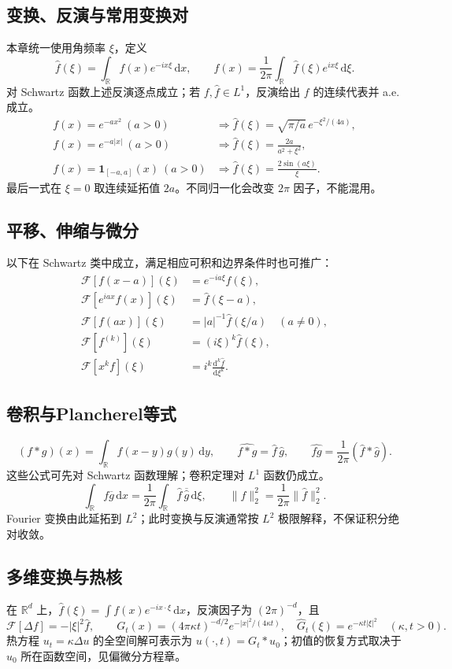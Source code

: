 \documentclass[../main.tex]{subfiles}
\begin{document}
\subsection{变换、反演与常用变换对}
本章统一使用角频率 $\xi$，定义
\[
\widehat f(\xi)=\int_{\mathbb R}f(x)e^{-ix\xi}\,\mathrm dx,\qquad
f(x)=\frac1{2\pi}\int_{\mathbb R}\widehat f(\xi)e^{ix\xi}\,\mathrm d\xi.
\]
对 Schwartz 函数上述反演逐点成立；若 $f,\widehat f\in L^1$，反演给出 $f$ 的连续代表并 a.e. 成立。
\begin{align*}
f(x)=e^{-ax^2}\ (a>0)&\Longrightarrow\widehat f(\xi)=\sqrt{\pi/a}\,e^{-\xi^2/(4a)},\\
f(x)=e^{-a|x|}\ (a>0)&\Longrightarrow\widehat f(\xi)=\frac{2a}{a^2+\xi^2},\\
f(x)=\bm1_{[-a,a]}(x)\ (a>0)&\Longrightarrow\widehat f(\xi)=\frac{2\sin(a\xi)}\xi.
\end{align*}
最后一式在 $\xi=0$ 取连续延拓值 $2a$。不同归一化会改变 $2\pi$ 因子，不能混用。
\subsection{平移、伸缩与微分}
以下在 Schwartz 类中成立，满足相应可积和边界条件时也可推广：
\begin{align*}
\mathcal F[f(x-a)](\xi)&=e^{-ia\xi}\widehat f(\xi),\\
\mathcal F[e^{iax}f(x)](\xi)&=\widehat f(\xi-a),\\
\mathcal F[f(ax)](\xi)&=|a|^{-1}\widehat f(\xi/a)\quad(a\ne0),\\
\mathcal F[f^{(k)}](\xi)&=(i\xi)^k\widehat f(\xi),\\
\mathcal F[x^kf](\xi)&=i^k\frac{\mathrm d^k\widehat f}{\mathrm d\xi^k}.
\end{align*}
\subsection{卷积与Plancherel等式}
\[
(f*g)(x)=\int_{\mathbb R}f(x-y)g(y)\,\mathrm dy,\qquad
\widehat{f*g}=\widehat f\,\widehat g,\qquad
\widehat{fg}=\frac1{2\pi}(\widehat f*\widehat g).
\]
这些公式可先对 Schwartz 函数理解；卷积定理对 $L^1$ 函数仍成立。
\[
\int_{\mathbb R}f\overline g\,\mathrm dx
=\frac1{2\pi}\int_{\mathbb R}\widehat f\,\overline{\widehat g}\,\mathrm d\xi,
\qquad \|f\|_2^2=\frac1{2\pi}\|\widehat f\|_2^2.
\]
Fourier 变换由此延拓到 $L^2$；此时变换与反演通常按 $L^2$ 极限解释，不保证积分绝对收敛。
\subsection{多维变换与热核}
在 $\mathbb R^d$ 上，$\widehat f(\xi)=\int f(x)e^{-ix\cdot\xi}\,\mathrm dx$，反演因子为 $(2\pi)^{-d}$，且
\[
\mathcal F[\Delta f]=- |\xi|^2\widehat f,\qquad
G_t(x)=(4\pi\kappa t)^{-d/2}e^{-|x|^2/(4\kappa t)},\quad
\widehat G_t(\xi)=e^{-\kappa t|\xi|^2}\quad(\kappa,t>0).
\]
热方程 $u_t=\kappa\Delta u$ 的全空间解可表示为 $u(\cdot,t)=G_t*u_0$；初值的恢复方式取决于 $u_0$ 所在函数空间，见偏微分方程章。
\end{document}
